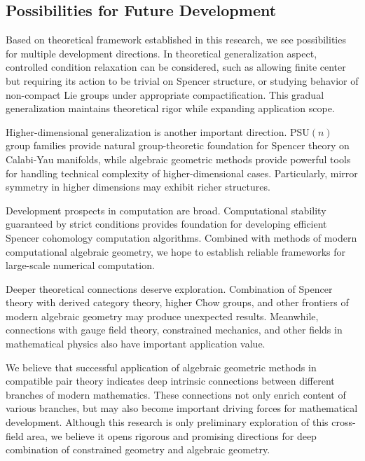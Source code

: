 \documentclass[a4paper,12pt]{extarticle}
\theoremstyle{definition}
\begin{document}
\subsection{Possibilities for Future Development}

Based on theoretical framework established in this research, we see possibilities for multiple development directions. In theoretical generalization aspect, controlled condition relaxation can be considered, such as allowing finite center but requiring its action to be trivial on Spencer structure, or studying behavior of non-compact Lie groups under appropriate compactification. This gradual generalization maintains theoretical rigor while expanding application scope.

Higher-dimensional generalization is another important direction. $\text{PSU}(n)$ group families provide natural group-theoretic foundation for Spencer theory on Calabi-Yau manifolds, while algebraic geometric methods provide powerful tools for handling technical complexity of higher-dimensional cases. Particularly, mirror symmetry in higher dimensions may exhibit richer structures.

Development prospects in computation are broad. Computational stability guaranteed by strict conditions provides foundation for developing efficient Spencer cohomology computation algorithms. Combined with methods of modern computational algebraic geometry, we hope to establish reliable frameworks for large-scale numerical computation.

Deeper theoretical connections deserve exploration. Combination of Spencer theory with derived category theory, higher Chow groups, and other frontiers of modern algebraic geometry may produce unexpected results. Meanwhile, connections with gauge field theory, constrained mechanics, and other fields in mathematical physics also have important application value.

We believe that successful application of algebraic geometric methods in compatible pair theory indicates deep intrinsic connections between different branches of modern mathematics. These connections not only enrich content of various branches, but may also become important driving forces for mathematical development. Although this research is only preliminary exploration of this cross-field area, we believe it opens rigorous and promising directions for deep combination of constrained geometry and algebraic geometry.



\end{document}
